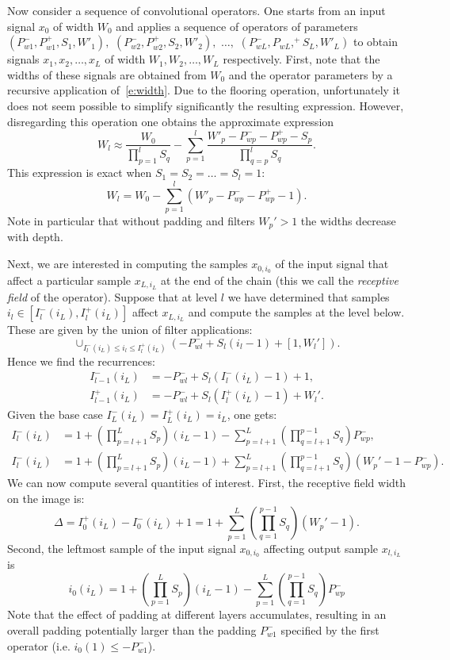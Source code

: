Now consider a sequence of convolutional operators. One starts from an input signal $x_0$ of width $W_0$ and applies a sequence of  operators of parameters
$
(P_{w1}^-,  P_{w1}^+, S_1, W'_1), 
$
$
(P_{w2}^-,  P_{w2}^+, S_2, W'_2), 
$
$\dots,
$
$
(P_{wL}^-,  P_{wL},^+ S_L, W'_L)
$
to obtain signals $x_1,x_2,\dots,x_L$ of width $W_1,W_2,\dots,W_L$ respectively. First, note that the widths of these signals are obtained from $W_0$ and the operator parameters by a recursive application of~\eqref{e:width}. Due to the flooring operation, unfortunately it does not seem possible to simplify significantly the resulting expression. However, disregarding this operation one obtains the approximate expression
\[
W_l \approx
\frac{W_0}{\prod_{p=1}^l S_q}
-
\sum_{p=1}^l
\frac
{W'_p - P_{wp}^- - P_{wp}^+  - S_{p}}
{\prod_{q=p}^l S_q}.
\]
This expression is exact when $S_1 = S_2 =\dots = S_l =1$:
\[
W_l = W_0 - \sum_{p=1}^l (W'_p - P_{wp}^- - P_{wp}^+ - 1).
\]
Note in particular that without padding and filters $W_p' >1$ the widths decrease with depth. 


Next, we are interested in computing the samples $x_{0,i_0}$ of the input signal that affect a particular sample $x_{L,i_L}$ at the end of the chain (this we call the \emph{receptive field} of the operator). Suppose that at level $l$ we have determined that samples $i_l \in [I_l^-(i_L), I_l^+(i_L)]$ affect $x_{L,i_L}$ and compute the samples at the level below. These are given by the union of filter applications:
\[
 \cup_{I_l^-(i_L) \leq i_l \leq I_l^+(i_L)} \left(-P_{wl}^- + S_l (i_l-1)  + [1, W_l'] \right).
\]
Hence we find the recurrences:
\begin{align*}
 I_{l-1}^-(i_L) &= - P_{wl}^- + S_l (I_l^-(i_L)-1) + 1,
 \\
 I_{l-1}^+(i_L) &= - P_{wl}^- + S_l (I_l^+(i_L)-1) + W_l'.
\end{align*}
Given the base case $I_L^-(i_L) = I_L^+(i_L) = i_L$,  one gets:
\begin{align*}
I_{l}^-(i_L)
&=
1 
+ \left(\prod_{p=l+1}^L S_p\right) (i_L - 1)
- \sum_{p =l+1}^L  \left(\prod_{q=l+1}^{p-1} S_q\right)P_{wp}^-,
\\
I_{l}^-(i_L)
&=
1 
+ \left(\prod_{p=l+1}^L S_p\right) (i_L - 1)
+ \sum_{p = l+1}^L  \left(\prod_{q=l+1}^{p-1} S_q\right)(W_p' - 1 - P_{wp}^-).
\end{align*}
We can now compute several quantities of interest. First, the receptive field width on the image is:
\[
 \Delta 
 = I_0^+(i_L) - I_0^-(i_L) + 1
 = 1+ \sum_{p = 1}^L  \left(\prod_{q=1}^{p-1} S_q\right)(W_p' - 1).
\]
Second, the leftmost sample of the input signal $x_{0,i_0}$ affecting output sample $x_{l,i_L}$ is
\[
i_0(i_L)  =
1 
+ \left(\prod_{p=1}^L S_p\right) (i_L - 1)
- \sum_{p =1}^L  \left(\prod_{q=1}^{p-1} S_q\right)P_{wp}^-
\]
Note that the effect of padding at different layers accumulates, resulting in an overall padding potentially larger than the padding $P_{w1}^-$ specified by the first operator (i.e. $i_0(1) \leq - P_{w1}^-$).

